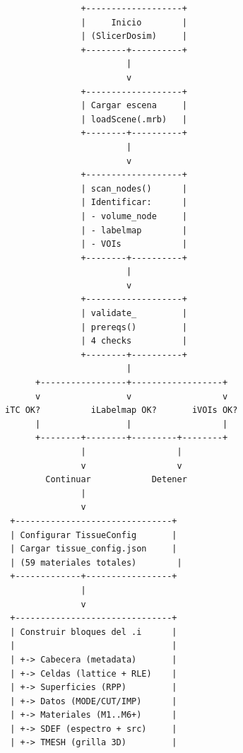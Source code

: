 \documentclass[12pt,a4paper]{article}
\begin{document}
\begin{verbatim}
                            +-------------------+
                            |     Inicio        |
                            | (SlicerDosim)     |
                            +--------+----------+
                                     |
                                     v
                            +-------------------+
                            | Cargar escena     |
                            | loadScene(.mrb)   |
                            +--------+----------+
                                     |
                                     v
                            +-------------------+
                            | scan_nodes()      |
                            | Identificar:      |
                            | - volume_node     |
                            | - labelmap        |
                            | - VOIs            |
                            +--------+----------+
                                     |
                                     v
                            +-------------------+
                            | validate_         |
                            | prereqs()         |
                            | 4 checks          |
                            +--------+----------+
                                     |
                   +-----------------+------------------+
                   v                 v                  v
             iTC OK?          iLabelmap OK?       iVOIs OK?
                   |                 |                  |
                   +--------+--------+---------+--------+
                            |                  |
                            v                  v
                     Continuar            Detener
                            |
                            v
              +-------------------------------+
              | Configurar TissueConfig       |
              | Cargar tissue_config.json     |
              | (59 materiales totales)        |
              +-------------+-----------------+
                            |
                            v
              +-------------------------------+
              | Construir bloques del .i      |
              |                               |
              | +-> Cabecera (metadata)       |
              | +-> Celdas (lattice + RLE)    |
              | +-> Superficies (RPP)         |
              | +-> Datos (MODE/CUT/IMP)      |
              | +-> Materiales (M1..M6+)      |
              | +-> SDEF (espectro + src)     |
              | +-> TMESH (grilla 3D)         |

\end{verbatim}
\end{document}
